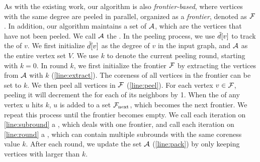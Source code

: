 As with the existing work, our algorithm is also \emph{frontier-based}, 
where vertices with the same degree are peeled in parallel, organized as a \emph{frontier}, denoted as ${\mathcal{F}}$. 
In addition, our algorithm maintains a set of  ${\mathcal{A}}$, 
which are the vertices that have not been peeled. 
We call ${\mathcal{A}}$ the . 
In the peeling process, we use $\tilde{d}[v]$ to track the \induceddegree{} of $v$. 
We first initialize $\tilde{d}[v]$ as the degree of $v$ in the input graph, and ${\mathcal{A}}$ as the entire vertex set $V$. 
We use $k$ to denote the current peeling round, starting with $k=0$. 
In round $k$, we first initialize the frontier ${\mathcal{F}}$ by extracting the vertices from ${\mathcal{A}}$ with \induceddegree{} $k$ (\cref{line:extract}). 
The coreness of all vertices in the frontier can be set to $k$. 
We then peel all vertices in ${\mathcal{F}}$ (\cref{line:peel}). 
For each vertex $v\in {\mathcal{F}}$, peeling it will decrement the \induceddegree{} for each of its neighbors by 1. 
When the \induceddegree{} of any vertex $u$ hits $k$, $u$ is added to a set $\mathcal{F}_{\text{next}}$, which becomes the next frontier. 
We repeat this process until the frontier becomes empty. 
We call each iteration on \cref{line:subround} a , which deals with one frontier, and call each iteration on \cref{line:round} a , which can contain multiple subrounds with the same coreness value $k$. 
After each round, we update the \alive{} set ${\mathcal{A}}$ (\cref{line:pack}) by only keeping vertices with  larger than $k$.




